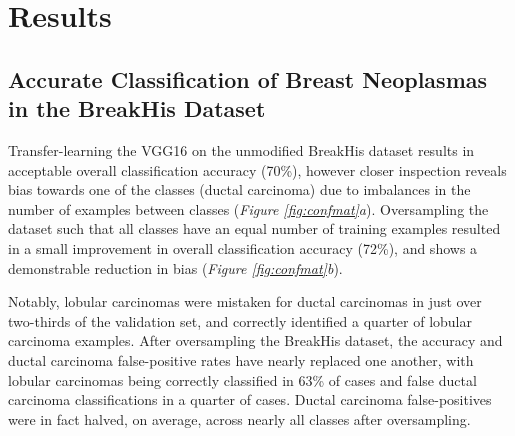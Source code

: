 \section{Results}

\subsection{Accurate Classification of Breast Neoplasmas in the BreakHis Dataset}

Transfer-learning the VGG16 on the unmodified BreakHis dataset results in acceptable overall classification accuracy (70\%), however closer inspection reveals bias towards one of the classes (ductal carcinoma) due to imbalances in the number of examples between classes (\emph{Figure \ref{fig:confmat}a}). Oversampling the dataset such that all classes have an equal number of training examples resulted in a small improvement in overall classification accuracy (72\%), and shows a demonstrable reduction in bias (\emph{Figure \ref{fig:confmat}b}).\par

Notably, lobular carcinomas were mistaken for ductal carcinomas in just over two-thirds of the validation set, and correctly identified a quarter of lobular carcinoma examples. After oversampling the BreakHis dataset, the accuracy and ductal carcinoma false-positive rates have nearly replaced one another, with lobular carcinomas being correctly classified in 63\% of cases and false ductal carcinoma classifications in a quarter of cases. Ductal carcinoma false-positives were in fact halved, on average, across nearly all classes after oversampling.\par

